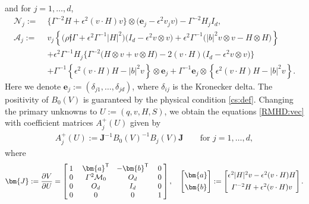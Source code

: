 \documentclass[twoside,11pt]{article}
\numberwithin{equation}{section}
\def\p{\partial}
\newcommand\w[1]{\makebox[1em]{$#1$}}
\begin{document}
and for $j=1,\ldots,d$,
\begin{align*}	
	\mathcal{N}_j:= \;&	\big\{\varGamma^{-2} {H}+\epsilon^2(v\cdot H )v \big\}\otimes	\big(\bm{e}_j- \epsilon^2 v_j v \big)- {\varGamma^{-2}} {H_j} I_d,\\[1mm]	
	\mathcal{A}_j:= \;&
	v_j\left\{
	\big(\rho \mathfrak{f}\varGamma+{\epsilon^2\varGamma^{-1} |H|^2}\big)\big(I_d-\epsilon^2v\otimes v \big)
	+\epsilon^2{\varGamma^{-1}} \big(|b|^2 v\otimes v  -H\otimes H\big)\right\}\\[0.5mm]
	&
	+{\epsilon^2 {\varGamma^{-1}} H_j}
	\big\{\varGamma^{-2} {\big(H\otimes v+v\otimes H\big)}
	-2(v\cdot H )\big(I_d-\epsilon^2 v\otimes v\big) \big\}\\[0.5mm]
	&+{\varGamma^{-1}} \left\{\epsilon^2 (v\cdot H )H-|b|^2v\right\}\otimes  {\bm{e}_j}
	+{\varGamma^{-1}} {\bm{e}_j} \otimes \left\{\epsilon^2 (v\cdot H )H-|b|^2v\right\}.
\end{align*}
Here we denote $\bm{e}_j:=(\delta_{j1},\ldots,\delta_{jd})$, where $\delta_{ij}$ is the Kronecker delta.
{The positivity of $B_0(V)$ is guaranteed by the physical condition \eqref{cs:def}.}
Changing the primary unknowns to $U:=(q,v,H,S) $, we obtain the equations \eqref{RMHD:vec} with coefficient matrices $A_j^+(U)$ given by
\setlength{\arraycolsep}{4.5pt}
\begin{align}
	\label{Ai.def.r}
	A_{j}^+(U):= {\bm{J}}^{-1}B_0(V)^{-1} B_{j}(V) {\bm{J}}\qquad
	\textrm{for }j=1,\ldots,d,
\end{align}
where
\begin{align}\label{J.bm:def}
	{\bm{J}}:=\frac{\p V}{\p U}
	=\begin{bmatrix}
		1 &  \bm{a}^{\mathsf{T}} & -\bm{b}^{\mathsf{T}} &0\\
		0 &   \varGamma^2\mathcal{M}_0 & O_d &0\\
		0 & O_d & I_d &0\\
		\w{0} & \w{0} & \w{0}& \w{1}
	\end{bmatrix},
	\quad
	\begin{bmatrix}
		\bm{a}\\[1.5mm] \bm{b}
	\end{bmatrix}:=
	\begin{bmatrix}
		\epsilon^2 |H|^2 v -\epsilon^2(v\cdot H) H\\[1.5mm]
		\varGamma^{-2}{H}+\epsilon^2 (v\cdot H)v
	\end{bmatrix}.
\end{align}
\end{document}
